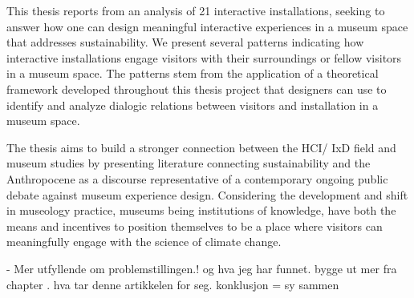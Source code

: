 This thesis reports from an analysis of 21 interactive installations, seeking to answer how one can design meaningful interactive experiences in a museum space that addresses sustainability. We present several patterns indicating how interactive installations engage visitors with their surroundings or fellow visitors in a museum space. The patterns stem from the application of a theoretical framework developed throughout this thesis project that designers can use to identify and analyze dialogic relations between visitors and installation in a museum space.

The thesis aims to build a stronger connection between the HCI/ IxD field and museum studies by presenting literature connecting sustainability and the Anthropocene as a discourse representative of a contemporary ongoing public debate against museum experience design. Considering the development and shift in museology practice, museums being institutions of knowledge, have both the means and incentives to position themselves to be a place where visitors can meaningfully engage with the science of climate change. %

- Mer utfyllende om problemstillingen.! og hva jeg har funnet. bygge ut mer fra chapter . hva tar denne artikkelen for seg.
konklusjon = sy sammen 
